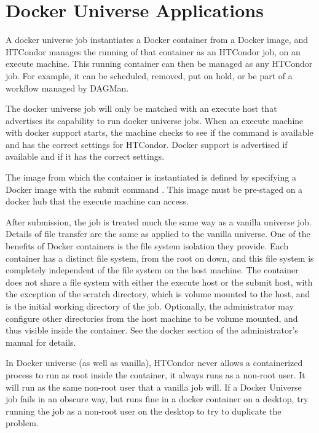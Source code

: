 \section{Docker Universe Applications}\label{sec:dockeruniverse}
A docker universe job instantiates a Docker container
from a Docker image, and HTCondor manages the running
of that container as an HTCondor job, on an execute machine.
This running container can then be managed as any HTCondor job.
For example, it can be scheduled, removed, put on hold, 
or be part of a workflow managed by DAGMan.

The docker universe job will only be matched with an execute host
that advertises its capability to run docker universe jobs.
When an execute machine with docker support starts, 
the machine checks to
see if the  command is available and has the correct
settings for HTCondor.  
Docker support is advertised if available and if it has the correct settings.

The image from which the container is instantiated is
defined by specifying a Docker image with the submit command
.  
This image must be pre-staged on a docker
hub that the execute machine can access.

After submission, the job is treated much the same way as a vanilla 
universe job.  
Details of file transfer are the same as applied to 
the vanilla universe.  
One of the benefits of Docker containers is 
the file system isolation they provide.  
Each container has a distinct file system, 
from the root on down, and this file
system is completely independent of the file system on the host machine.
The container does not share a file system with either the execute
host or the submit host, with the exception of the scratch directory,
which is volume mounted to the host, and is the initial working
directory of the job.  Optionally, the administrator may configure other
directories from the host machine to be volume mounted, and thus visible
inside the container.  See the docker section of the administrator's manual
for details.

In Docker universe (as well as vanilla), HTCondor never allows a containerized 
process to run as root inside the container, it always runs as a non-root user.
It will run as the same non-root user that a vanilla job will. If a 
Docker Universe job fails in an obscure way, but runs fine in a docker
container on a desktop, try running the job as a non-root user on the desktop
to try to duplicate the problem.

